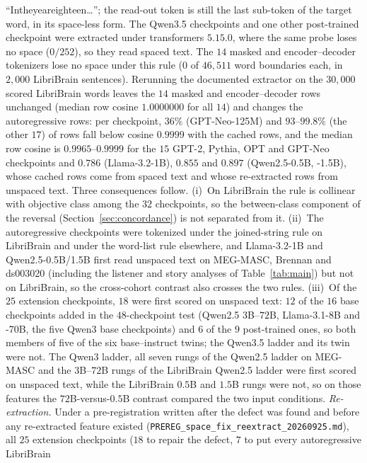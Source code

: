 \documentclass{article}
\begin{document}
``Intheyeareighteen\ldots''; the read-out token is still the last sub-token of the target word, in
its space-less form. The Qwen3.5 checkpoints and one other post-trained checkpoint were extracted
under transformers $5.15.0$, where the same probe loses no space ($0/252$), so they read spaced
text. The $14$ masked and encoder--decoder tokenizers lose no space under this rule
($0$ of $46{,}511$ word boundaries each, in $2{,}000$ LibriBrain sentences). Rerunning the documented extractor on the $30{,}000$ scored LibriBrain
words leaves the $14$ masked and encoder--decoder rows unchanged (median row cosine $1.0000000$
for all $14$) and changes the autoregressive rows: per checkpoint, $36\%$ (GPT-Neo-125M) and
$93$--$99.8\%$ (the other $17$) of rows fall below cosine $0.9999$ with the cached rows, and the
median row cosine is $0.9965$--$0.9999$ for the $15$ GPT-2, Pythia, OPT and GPT-Neo checkpoints and
$0.786$ (Llama-3.2-1B), $0.855$ and $0.897$ (Qwen2.5-0.5B, -1.5B), whose cached rows come from
spaced text and whose re-extracted rows from unspaced text. Three consequences follow.
(i)~On LibriBrain the rule is collinear with objective class among the $32$ checkpoints, so the
between-class component of the reversal (Section~\ref{sec:concordance}) is not separated from it.
(ii)~The autoregressive checkpoints were tokenized under the joined-string rule on LibriBrain and
under the word-list rule elsewhere, and Llama-3.2-1B and Qwen2.5-0.5B/1.5B first read unspaced text on
MEG-MASC, Brennan and ds003020 (including the listener and story analyses of Table~\ref{tab:main})
but not on LibriBrain, so the cross-cohort contrast also crosses the two rules. (iii)~Of the $25$
extension checkpoints, $18$ were first scored on unspaced text: $12$ of the $16$ base checkpoints added in
the $48$-checkpoint test (Qwen2.5 $3$B--$72$B, Llama-3.1-8B and -70B, the five Qwen3 base
checkpoints) and $6$ of the $9$ post-trained ones, so both members of five of the six base--instruct
twins; the Qwen3.5 ladder and its twin were not. The Qwen3 ladder, all seven rungs of the Qwen2.5
ladder on MEG-MASC and the $3$B--$72$B rungs of the LibriBrain Qwen2.5 ladder were first scored on
unspaced text, while the LibriBrain $0.5$B and $1.5$B rungs were not, so on those features the
$72$B-versus-$0.5$B contrast compared the two input conditions.
\emph{Re-extraction.} Under a pre-registration written after the defect was found and before any
re-extracted feature existed (\texttt{PREREG\_space\_fix\_reextract\_20260925.md}), all $25$
extension checkpoints ($18$ to repair the defect, $7$ to put every autoregressive LibriBrain
\end{document}
